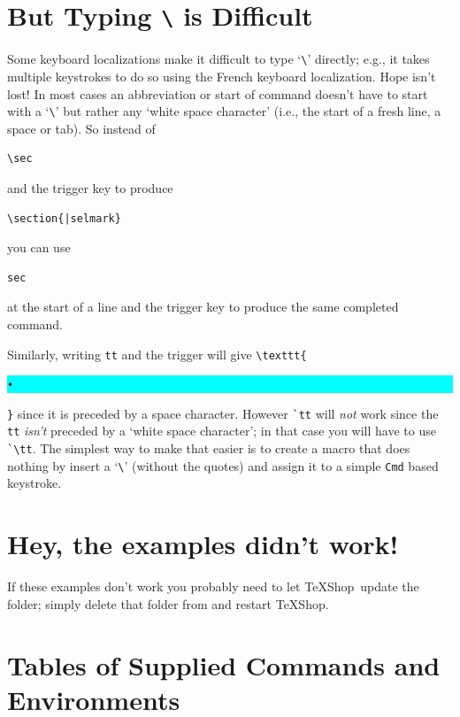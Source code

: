 \documentclass[11pt]{article}
\newcommand{\mnu}[1]{\texttt{#1}}
\newcommand{\cmd}[1]{\texttt{#1}}
\newcommand{\selmark}{\colorbox{cyan}{\rule[-0.5ex]{0ex}{2.1ex}\texttt{•}}}
\newcommand{\TS}{\textsf{\TeX Shop}}
\begin{document}
\section*{But Typing \cmd{\textbackslash} is Difficult}

Some keyboard localizations make it difficult to type `\verb|\|' directly; e.g., it takes multiple keystrokes to do so using the French keyboard localization. Hope isn't lost! In most cases an abbreviation or start of command doesn't have to start with a `\verb|\|' but rather any `white space character' (i.e., the start of a fresh line, a space or tab). So instead of 
\begin{verbatim}
\sec
\end{verbatim}
and the trigger key to produce
\begin{verbatim}
\section{|selmark}
\end{verbatim}
you can use
\begin{verbatim}
sec
\end{verbatim}
at the start of a line and the trigger key to produce the same completed command.

Similarly, writing \verb|tt| and the trigger will give \verb|\texttt{|\selmark\verb|}| since it is preceded by a space character. However \verb|`tt| will \emph{not} work since the \verb|tt| \emph{isn't} preceded by a `white space character'; in that case you will have to use \verb|`\tt|. The simplest way to make that easier is to create a macro that does nothing by insert a `\verb|\|' (without the quotes) and assign it to a simple \mnu{Cmd} based keystroke.

\section*{Hey, the examples didn't work!}

If these examples don't work you probably need to let \TS\ update the  folder; simply delete that folder from  and restart \TS.

\section*{Tables of Supplied Commands and Environments}
\end{document}
